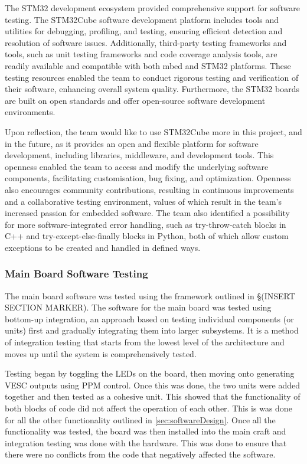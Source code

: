 \documentclass [12pt]{article}
\begin{document}
The STM32 development ecosystem provided comprehensive support for software testing. The STM32Cube software development platform includes tools and utilities for debugging, profiling, and testing, ensuring efficient detection and resolution of software issues. Additionally, third-party testing frameworks and tools, such as unit testing frameworks and code coverage analysis tools, are readily available and compatible with both mbed and STM32 platforms. These testing resources enabled the team to conduct rigorous testing and verification of their software, enhancing overall system quality. Furthermore, the STM32 boards are built on open standards and offer open-source software development environments.  

Upon reflection, the team would like to use STM32Cube more in this project, and in the future, as it provides an open and flexible platform for software development, including libraries, middleware, and development tools. This openness enabled the team to access and modify the underlying software components, facilitating customisation, bug fixing, and optimization. Openness also encourages community contributions, resulting in continuous improvements and a collaborative testing environment, values of which result in the team’s increased passion for embedded software.
The team also identified a possibility for more software-integrated error handling, such as try-throw-catch blocks in C++ and try-except-else-finally blocks in Python, both of which allow custom exceptions to be created and handled in defined ways.


\subsubsection{Main Board Software Testing}
The main board software was tested using the framework outlined in §(INSERT SECTION MARKER). The software for the main board was tested using bottom-up integration, an approach based on testing individual components (or units) first and gradually integrating them into larger subsystems. It is a method of integration testing that starts from the lowest level of the architecture and moves up until the system is comprehensively tested. 

Testing began by toggling the LEDs on the board, then moving onto generating VESC outputs using PPM control. Once this was done, the two units were added together and then tested as a cohesive unit. This showed that the functionality of both blocks of code did not affect the operation of each other. This is was done for all the other functionality outlined in \ref{sec:softwareDesign}. Once all the functionality was tested, the board was then installed into the main craft and integration testing was done with the hardware. This was done to ensure that there were no conflicts from the code that negatively affected the software. 
\end{document}
